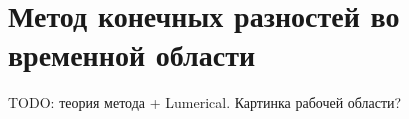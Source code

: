 \section{Метод конечных разностей во временной области}

TODO: теория метода \cite{Yee1966} + Lumerical. Картинка рабочей области?